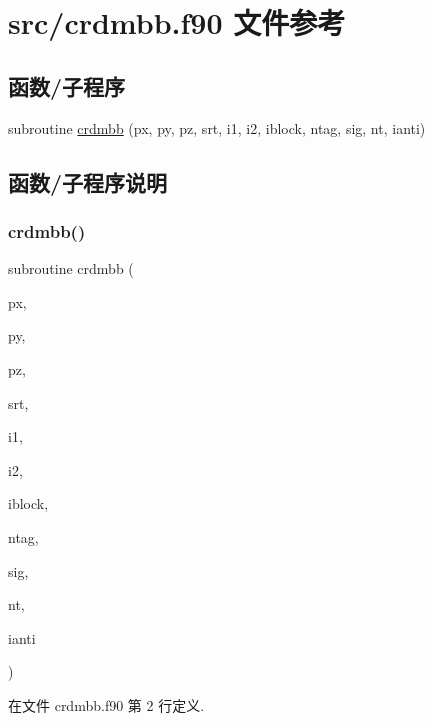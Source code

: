 \hypertarget{crdmbb_8f90}{}\section{src/crdmbb.f90 文件参考}
\label{crdmbb_8f90}
\subsection*{函数/子程序}
\begin{DoxyCompactItemize}
\item 
subroutine \mbox{\hyperlink{crdmbb_8f90_a919fdb85fb54df3694e88ddff1605bcf}{crdmbb}} (px, py, pz, srt, i1, i2, iblock, ntag, sig, nt, ianti)
\end{DoxyCompactItemize}


\subsection{函数/子程序说明}
\mbox{\label{crdmbb_8f90_a919fdb85fb54df3694e88ddff1605bcf}} 
\subsubsection{\texorpdfstring{crdmbb()}{crdmbb()}}
{\footnotesize\ttfamily subroutine crdmbb (\begin{DoxyParamCaption}\item[{}]{px,  }\item[{}]{py,  }\item[{}]{pz,  }\item[{}]{srt,  }\item[{}]{i1,  }\item[{}]{i2,  }\item[{}]{iblock,  }\item[{}]{ntag,  }\item[{}]{sig,  }\item[{}]{nt,  }\item[{}]{ianti }\end{DoxyParamCaption})}



在文件 crdmbb.\+f90 第 2 行定义.

